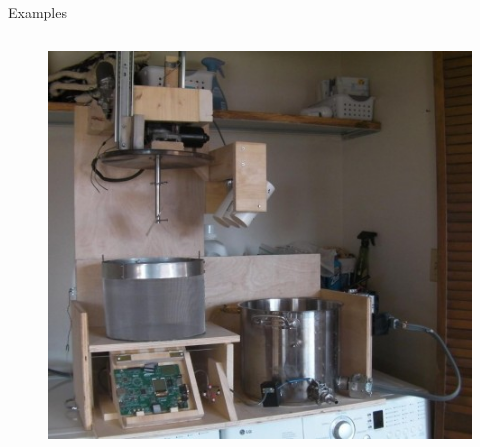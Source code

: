 \documentclass{beamer}
\begin{document}
\begin{frame}{Examples}
\begin{columns}
\begin{column}[r]{0.5\textwidth}
\begin{itemize}
\end{itemize}
\vfill
\begin{figure}
\includegraphics[width=0.8\columnwidth]{./figures/brewery.jpg}
\end{figure}
\end{column}
\end{columns}
\end{frame}
\end{document}

